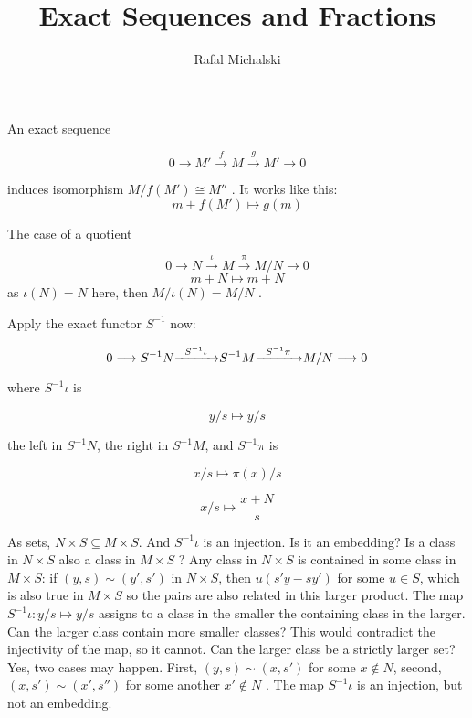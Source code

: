 \documentclass{article}
\title{Exact Sequences and Fractions}
\author{Rafal Michalski}
\date{}
\begin{document}
 

\maketitle

An exact sequence

\[
0 \longrightarrow M' \overset{f}{\longrightarrow} M \overset{g}{\longrightarrow} M' \longrightarrow 0
\]

\noindent
induces isomorphism $M/f(M') \cong M''$ . It works like this:
\[
m + f(M') \mapsto g(m)
\]

\noindent
The case of a quotient

\[
0 \longrightarrow N \overset{\iota}{\longrightarrow} M \overset{\pi}{\longrightarrow} M/N \longrightarrow 0
\]
\[
m + N \mapsto m + N
\]
\noindent
as $\iota(N) = N$ here, then $M / \iota(N) = M/N$ .

\vspace{2mm}

Apply the exact functor $S^{-1}$ now:

\[
0  \longrightarrow S^{-1}N {\xrightarrow{\hspace{2mm}S^{-1}\iota\hspace{2mm}}} S^{-1}M {\xrightarrow{\hspace{2mm}S^{-1}\pi\hspace{2mm}}} M/N \longrightarrow 0
\]

\noindent
where $S^{-1}\iota$ is

\[
y/s \mapsto  y/s
\]

\noindent
the left in $S^{-1}N$, the right in $S^{-1}M$, and $S^{-1}\pi$ is

\[
x/s \mapsto \pi(x)/s 
\]

\[
x/s \mapsto \frac{x + N}{s}
\]

As sets, $N \times S \subseteq M \times S$. And $S^{-1}\iota$ is an injection. Is it an embedding? Is a class in $N \times S$ also a class in $M \times S$ ? Any class in $N \times S$ is contained in some class in $M \times S$: if $(y, s) \sim (y', s')$ in $N \times S$, then $u(s'y - sy')$ for some $u \in S$, which is also true in $M \times S$ so the pairs are also related in this larger product. The map $S^{-1}\iota: y/s \mapsto y/s$ assigns to a class in the smaller the containing class in the larger. Can the larger class contain more smaller classes? This would contradict the injectivity of the map, so it cannot. Can the larger class be a strictly larger set? Yes, two cases may happen. First, $(y, s) \sim (x, s')$ for some $x \notin N$, second, $(x, s') \sim (x', s'')$ for some another $x' \notin N$ . The map $S^{-1}\iota$ is an injection, but not an embedding.
\end{document}
